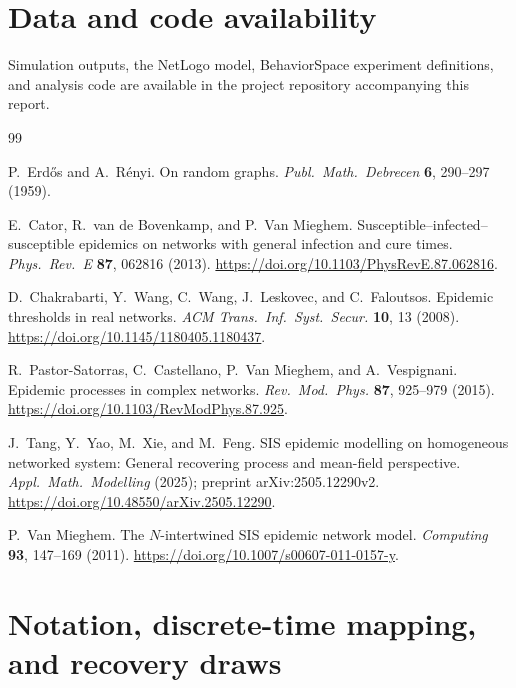 \documentclass[11pt,a4paper]{article}
\begin{document}
\section*{Data and code availability}
\label{sec:data-availability}
{}

Simulation outputs, the NetLogo model, BehaviorSpace experiment definitions, and analysis code are available in the project repository accompanying this report.

\begin{thebibliography}{99}

P.~Erd\H{o}s and A.~R\'enyi.
\newblock On random graphs.
\newblock \emph{Publ.\ Math.\ Debrecen} \textbf{6}, 290--297 (1959).

E.~Cator, R.~van de Bovenkamp, and P.~Van Mieghem.
\newblock Susceptible--infected--susceptible epidemics on networks with general infection and cure times.
\newblock \emph{Phys.\ Rev.\ E} \textbf{87}, 062816 (2013).
\newblock \url{https://doi.org/10.1103/PhysRevE.87.062816}.

D.~Chakrabarti, Y.~Wang, C.~Wang, J.~Leskovec, and C.~Faloutsos.
\newblock Epidemic thresholds in real networks.
\newblock \emph{ACM Trans.\ Inf.\ Syst.\ Secur.} \textbf{10}, 13 (2008).
\newblock \url{https://doi.org/10.1145/1180405.1180437}.


R.~Pastor-Satorras, C.~Castellano, P.~Van Mieghem, and A.~Vespignani.
\newblock Epidemic processes in complex networks.
\newblock \emph{Rev.\ Mod.\ Phys.} \textbf{87}, 925--979 (2015).
\newblock \url{https://doi.org/10.1103/RevModPhys.87.925}.


J.~Tang, Y.~Yao, M.~Xie, and M.~Feng.
\newblock SIS epidemic modelling on homogeneous networked system: General recovering process and mean-field perspective.
\newblock \emph{Appl.\ Math.\ Modelling} (2025); preprint arXiv:2505.12290v2.
\newblock \url{https://doi.org/10.48550/arXiv.2505.12290}.

P.~Van Mieghem.
\newblock The $N$-intertwined SIS epidemic network model.
\newblock \emph{Computing} \textbf{93}, 147--169 (2011).
\newblock \url{https://doi.org/10.1007/s00607-011-0157-y}.

\end{thebibliography}

\clearpage
\appendix

\section{Notation, discrete-time mapping, and recovery draws}
\label{app:notation}
\end{document}
